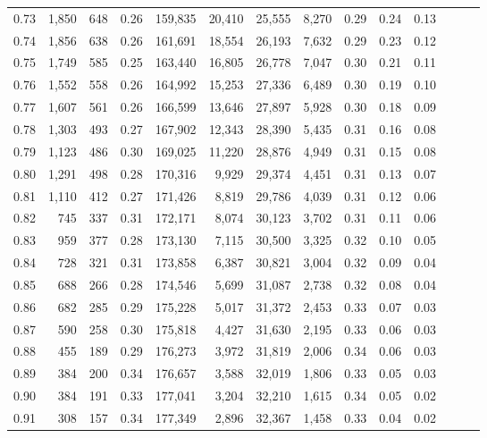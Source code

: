 \begin{tabular}{rrrrrrrrrrrrrr}
0.73 &  1,850 &  648 &  0.26 &  159,835 &   20,410 &  25,555 &   8,270 &  0.29 &  0.24 &      0.13 \\
0.74 &  1,856 &  638 &  0.26 &  161,691 &   18,554 &  26,193 &   7,632 &  0.29 &  0.23 &      0.12 \\
0.75 &  1,749 &  585 &  0.25 &  163,440 &   16,805 &  26,778 &   7,047 &  0.30 &  0.21 &      0.11 \\
0.76 &  1,552 &  558 &  0.26 &  164,992 &   15,253 &  27,336 &   6,489 &  0.30 &  0.19 &      0.10 \\
0.77 &  1,607 &  561 &  0.26 &  166,599 &   13,646 &  27,897 &   5,928 &  0.30 &  0.18 &      0.09 \\
0.78 &  1,303 &  493 &  0.27 &  167,902 &   12,343 &  28,390 &   5,435 &  0.31 &  0.16 &      0.08 \\
0.79 &  1,123 &  486 &  0.30 &  169,025 &   11,220 &  28,876 &   4,949 &  0.31 &  0.15 &      0.08 \\
0.80 &  1,291 &  498 &  0.28 &  170,316 &    9,929 &  29,374 &   4,451 &  0.31 &  0.13 &      0.07 \\
0.81 &  1,110 &  412 &  0.27 &  171,426 &    8,819 &  29,786 &   4,039 &  0.31 &  0.12 &      0.06 \\
0.82 &    745 &  337 &  0.31 &  172,171 &    8,074 &  30,123 &   3,702 &  0.31 &  0.11 &      0.06 \\
0.83 &    959 &  377 &  0.28 &  173,130 &    7,115 &  30,500 &   3,325 &  0.32 &  0.10 &      0.05 \\
0.84 &    728 &  321 &  0.31 &  173,858 &    6,387 &  30,821 &   3,004 &  0.32 &  0.09 &      0.04 \\
0.85 &    688 &  266 &  0.28 &  174,546 &    5,699 &  31,087 &   2,738 &  0.32 &  0.08 &      0.04 \\
0.86 &    682 &  285 &  0.29 &  175,228 &    5,017 &  31,372 &   2,453 &  0.33 &  0.07 &      0.03 \\
0.87 &    590 &  258 &  0.30 &  175,818 &    4,427 &  31,630 &   2,195 &  0.33 &  0.06 &      0.03 \\
0.88 &    455 &  189 &  0.29 &  176,273 &    3,972 &  31,819 &   2,006 &  0.34 &  0.06 &      0.03 \\
0.89 &    384 &  200 &  0.34 &  176,657 &    3,588 &  32,019 &   1,806 &  0.33 &  0.05 &      0.03 \\
0.90 &    384 &  191 &  0.33 &  177,041 &    3,204 &  32,210 &   1,615 &  0.34 &  0.05 &      0.02 \\
0.91 &    308 &  157 &  0.34 &  177,349 &    2,896 &  32,367 &   1,458 &  0.33 &  0.04 &      0.02 \\

\end{tabular}
